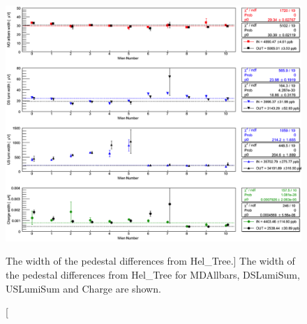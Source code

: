 
\begin{singlespace}
\begin{figure}[!h]
	\centering
	\includegraphics[width=15.0cm]{figures/differencesSumWidth}
	\caption
	[The width of the pedestal differences from Hel\_Tree.]
	{The width of the pedestal differences from Hel\_Tree for MDAllbars, DSLumiSum, USLumiSum and Charge are shown.}
	\label{fig:differencesSumWidth}
\end{figure}
\end{singlespace}

